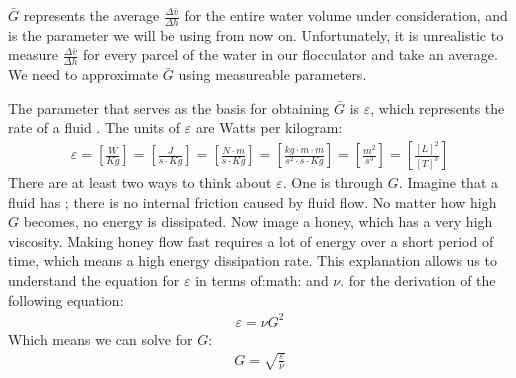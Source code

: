 \documentclass[letterpaper,10pt,english]{sphinxmanual}
\begin{document}
\(\bar G\) represents the average \(\frac{\Delta \bar v}{\Delta h}\) for the entire water volume under consideration, and is the parameter we will be using from now on. Unfortunately, it is unrealistic to measure \(\frac{\Delta \bar v}{\Delta h}\) for every parcel of the water in our flocculator and take an average. We need to approximate \(\bar G\) using measureable parameters.

The parameter that serves as the basis for obtaining \(\bar G\) is \(\varepsilon\), which represents the  rate of a fluid . The units of \(\varepsilon\) are Watts per kilogram:
\begin{equation}\label{equation:Flocculation/Floc_Design:Flocculation/Floc_Design:1}
\begin{split}\varepsilon = \left[ \frac{W}{Kg} \right] = \left[ \frac{J}{s \cdot Kg} \right] = \left[ \frac{N \cdot m}{s \cdot Kg} \right] = \left[ \frac{kg \cdot m \cdot m}{s^2 \cdot s \cdot Kg} \right] = \left[ \frac{m^2}{s^3} \right] = \left[ \frac{[L]^2}{[T]^3} \right]\end{split}
\end{equation}
There are at least two ways to think about \(\varepsilon\). One is through \(G\). Imagine that a fluid has  ; there is no internal friction caused by fluid flow. No matter how high \(G\) becomes, no energy is dissipated. Now image a honey, which has a very high viscosity. Making honey flow fast requires a lot of energy over a short period of time, which means a high energy dissipation rate. This explanation allows us to understand the equation for \(\varepsilon\) in terms of:math: and \(\nu\).  for the derivation of the following equation:
\begin{equation}\label{equation:Flocculation/Floc_Design:Flocculation/Floc_Design:2}
\begin{split}\varepsilon = \nu G^2\end{split}
\end{equation}
Which means we can solve for \(G\):
\begin{equation}\label{equation:Flocculation/Floc_Design:Flocculation/Floc_Design:3}
\begin{split}G = \sqrt{\frac{\varepsilon}{\nu}}\end{split}
\end{equation}
\end{document}
